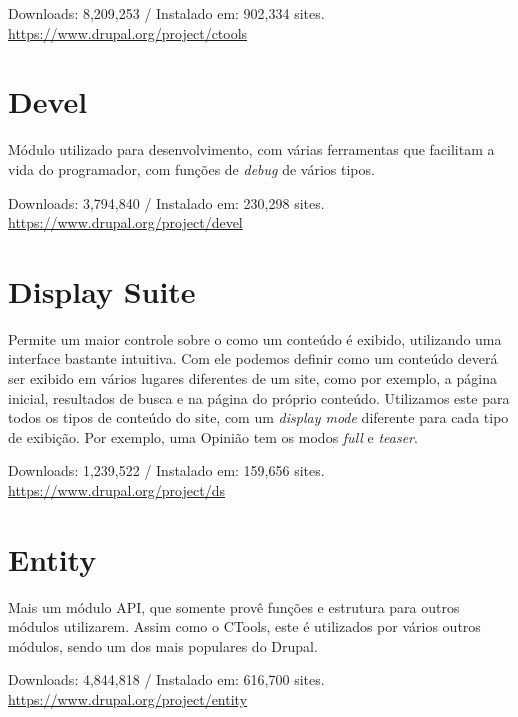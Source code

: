 \begin{center}
  Downloads: 8,209,253 / Instalado em: 902,334 sites. \\
  \url{https://www.drupal.org/project/ctools}
\end{center}

\section{Devel}
Módulo utilizado para desenvolvimento, com várias ferramentas que facilitam a vida do programador, com funções de \textit{debug} de vários tipos.

\begin{center}
  Downloads: 3,794,840 / Instalado em: 230,298 sites.
  \url{https://www.drupal.org/project/devel}
\end{center}

\section{Display Suite}
Permite um maior controle sobre o como um conteúdo é exibido, utilizando uma interface bastante intuitiva. Com ele podemos definir como um conteúdo deverá ser exibido em vários lugares diferentes de um site, como por exemplo, a página inicial, resultados de busca e na página do próprio conteúdo. Utilizamos este para todos os tipos de conteúdo do site, com um \textit{display mode} diferente para cada tipo de exibição. Por exemplo, uma Opinião tem os modos \textit{full} e \textit{teaser}.

\begin{center}
  Downloads: 1,239,522 / Instalado em: 159,656 sites. \\
  \url{https://www.drupal.org/project/ds}
\end{center}

\section{Entity}
Mais um módulo API, que somente provê funções e estrutura para outros módulos utilizarem. Assim como o CTools, este é utilizados por vários outros módulos, sendo um dos mais populares do Drupal.

\begin{center}
  Downloads: 4,844,818 / Instalado em: 616,700 sites. \\
  \url{https://www.drupal.org/project/entity}
\end{center}

